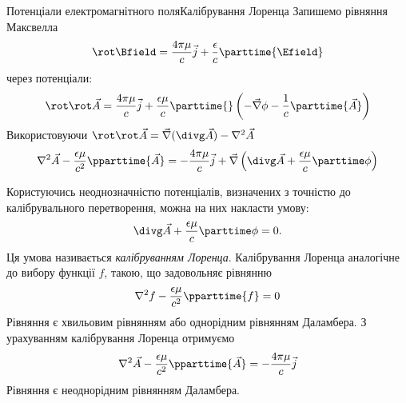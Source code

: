 \documentclass[onlytextwidth]{beamer}
\let\vect\vec
\begin{document}
\begin{frame}{Потенціали електромагнітного поля}{Калібрування Лоренца}
	Запишемо рівняння Максвелла
	\begin{equation*}
		\rot\Bfield = \frac{4\pi\mu}{c}\vect{j} + \frac{\epsilon}{c}\parttime{\Efield}
	\end{equation*}
	через потенціали:
	\begin{equation*}
		\rot\rot\vect{A} = \frac{4\pi\mu}{c}\vect{j} + \frac{\epsilon\mu}{c} \parttime{}\left( - \vect{\nabla}\phi - \frac1c\parttime{\vect{A}}\right)
	\end{equation*}
	Використовуючи $ \rot\rot\vect{A} =   \vect{\nabla}(\divg\vect{A}) - \nabla^2\vect{A}$
	\begin{equation*}
		\nabla^2\vect{A} - \frac{ \epsilon\mu }{c^2} \pparttime{\vect{A}} = - \frac{4\pi\mu}{c}\vect{j} + \vect{\nabla}\left( \divg\vect{A} + \frac{\epsilon\mu}{c} \parttime\phi\right)
	\end{equation*}
	\begin{overprint}
		Користуючись неоднозначністю потенціалів, визначених з
		точністю до калібрувального перетворення, можна на них накласти умову:
		\begin{equation*}
			\divg\vect{A} + \frac{\epsilon\mu}{c} \parttime\phi = 0.
		\end{equation*}
		Ця умова називається \emph{калібруванням Лоренца}.
		\onslide<2>
		Калібрування Лоренца аналогічне до вибору функції $ f $, такою, що задовольняє рівнянню
		\begin{equation*}
			\nabla^2 f - \frac{ \epsilon\mu }{c^2} \pparttime{f} = 0
		\end{equation*}
		{\scriptsize Рівняння є хвильовим рівнянням або однорідним рівнянням Даламбера.}
		\onslide<3>
		З урахуванням калібрування Лоренца отримуємо
		\begin{equation*}
			\nabla^2\vect{A} - \frac{ \epsilon\mu }{c^2} \pparttime{\vect{A}} = - \frac{4\pi\mu}{c}\vect{j}
		\end{equation*}
		{\scriptsize Рівняння є неоднорідним рівнянням Даламбера.}
	\end{overprint}
\end{frame}
\end{document}
